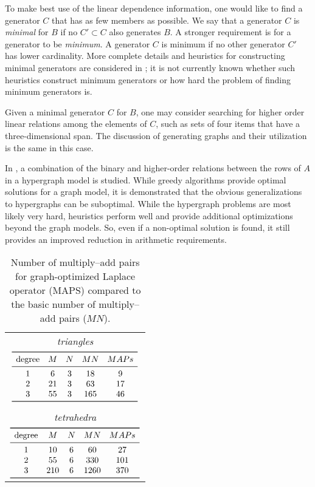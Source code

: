 To make best use of the linear dependence information, one would like
to find a generator $C$ that has as few members as possible. We
say that a generator $C$ is \emph{minimal} for $B$ if no $C'
\subset C$ also generates $B$. A stronger requirement is for a
generator to be \emph{minimum}. A generator $C$ is minimum if no other
generator $C'$ has lower cardinality. More complete details and
heuristics for constructing minimal generators are considered
in \citet{KirbyScott2007}; it is not currently known whether such
heuristics construct minimum generators or how hard the problem of
finding minimum generators is.%

Given a minimal generator $C$ for $B$, one may consider searching for
higher order linear relations among the elements of $C$, such as sets
of four items that have a three-dimensional span. The discussion of
generating graphs and their utilization is the same in this case.

In \citet{WolfHeath2009}, a combination of the binary and higher-order
relations between the rows of $A$ in a hypergraph model is studied.
While greedy algorithms provide optimal solutions for a graph model,
it is demonstrated that the obvious generalizations to hypergraphs can
be suboptimal. While the hypergraph problems are most likely very
hard, heuristics perform well and provide additional optimizations
beyond the graph models. So, even if a non-optimal solution is found,
it still provides an improved reduction in arithmetic requirements.

\begin{table}
  \centering
    \begin{tabular}{c}
      \emph{triangles} \\
      $\begin{array}{ccccc}
        \toprule
        {\rm degree} & M & N & MN & MAPs \\
        \midrule
        1 &6 &3& 18& 9 \\
        2 &21& 3& 63& 17\\
        3 &55& 3& 165& 46 \\
        \bottomrule
      \end{array}$
      \\
      \\
      \emph{tetrahedra} \\
      $\begin{array}{ccccc}
        \toprule
        {\rm degree} & M & N & MN & MAPs \\
        \midrule
        1 & 10 & 6 &60 &27 \\
        2 & 55 & 6 & 330 &101 \\
        3 & 210 &6 &1260 &370 \\
        \bottomrule
      \end{array}$
    \end{tabular}
    \caption{Number of multiply--add pairs for graph-optimized Laplace
      operator (MAPS) compared to the basic number of multiply--add pairs
      ($MN$).}
    \label{tab:kirby-4:graph}
\end{table}


